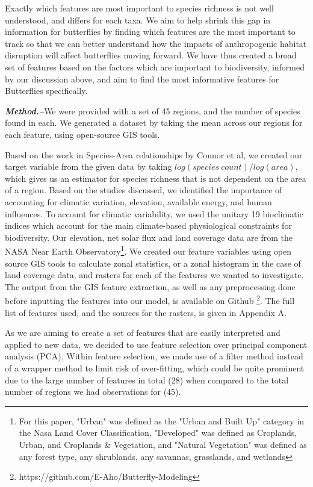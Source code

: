\documentclass[prl,showpacs,superscriptaddress,twocolumn,longbibliography]{revtex4-1}
\begin{document}
Exactly which features are most important to species richness is not well understood, and differs for each taxa. We aim to help shrink this gap in information for butterflies by finding which features are the most important to track so that we can better understand how the impacts of anthropogenic habitat disruption will affect butterflies moving forward. We have thus created a broad set of features based on the factors which are important to biodiversity, informed by our discussion above, and aim to find the most informative features for Butterflies specifically.


\noindent 

{\bf\em Method.--}We were provided with a set of 45 regions, and the number of species found in each. We generated a dataset by taking the mean across our regions for each feature, using open-source GIS tools.

Based on the work in Species-Area relationships by Connor et al\cite{connor_2001_sar}, we created our target variable from the given data by taking $log(species \: count)/log(area)$, which gives us an estimator for species richness that is not dependent on the area of a region. Based on the studies discussed, we identified the importance of accounting for climatic variation, elevation, available energy, and human influences.  To account for climatic variability, we used the unitary 19 bioclimatic indices which account for the main climate-based physiological constraints for biodiversity\cite{hijmans_very_2005}. Our elevation, net solar flux and land coverage data are from the NASA Near Earth Observatory\footnote{For this paper, "Urban" was defined as the "Urban and Built Up" category in the Nasa Land Cover Classification, "Developed" was defined as Croplands, Urban, and Croplands & Vegetation, and "Natural Vegetation" was defined as any forest type, any shrublands, any savannas, grasslands, and wetlands}. We created our feature variables using open source GIS tools\cite{QGIS_software} to calculate zonal statistics, or a zonal histogram in the case of land coverage data, and rasters for each of the features we wanted to investigate. The output from the GIS feature extraction, as well as any preprocessing done before inputting the features into our model, is available on Github \footnote{https://github.com/E-Aho/Butterfly-Modeling}. The full list of features used, and the sources for the rasters, is given in Appendix A.

As we are aiming to create a set of features that are easily interpreted and applied to new data, we decided to use feature selection over principal component analysis (PCA). Within feature selection, we made use of a filter method instead of a wrapper method to limit risk of over-fitting, which could be quite prominent due to the large number of features in total (28) when compared to the total number of regions we had observations for (45).
\end{document}
